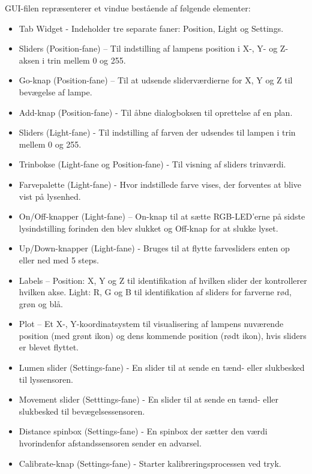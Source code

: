 GUI-filen repræsenterer et vindue bestående af følgende elementer:
\begin{itemize}

\item Tab Widget - Indeholder tre separate faner: Position, Light og Settings.

\item Sliders (Position-fane) – Til indstilling af lampens position i X-, Y- og Z-aksen i trin mellem 0 og 255.

\item Go-knap (Position-fane) – Til at udsende sliderværdierne for X, Y og Z til bevægelse af lampe.

\item Add-knap (Position-fane) - Til åbne dialogboksen til oprettelse af en plan.

\item Sliders (Light-fane) - Til indstilling af farven der udsendes til lampen i trin mellem 0 og 255.

\item Trinbokse (Light-fane og Position-fane) - Til visning af sliders trinværdi.

\item Farvepalette (Light-fane) - Hvor indstillede farve vises, der forventes at blive vist på lysenhed.

\item On/Off-knapper (Light-fane) – On-knap til at sætte RGB-LED’erne på sidste lysindstilling forinden den blev slukket og Off-knap for at slukke lyset.

\item Up/Down-knapper (Light-fane) - Bruges til at flytte farvesliders enten op eller ned med 5 steps.

\item Labels – Position: X, Y og Z til identifikation af hvilken slider der kontrollerer hvilken akse. Light: R, G og B til identifikation af sliders for farverne rød, grøn og blå.

\item Plot – Et X-, Y-koordinatsystem til visualisering af lampens nuværende position (med grønt ikon) og dens kommende position (rødt ikon), hvis sliders er blevet flyttet.

\item Lumen slider (Settings-fane) - En slider til at sende en tænd- eller slukbesked til lyssensoren.

\item Movement slider (Setttings-fane) - En slider til at sende en tænd- eller slukbesked til bevægelsessensoren.

\item Distance spinbox (Settings-fane) - En spinbox der sætter den værdi hvorindenfor afstandssensoren sender en advarsel.

\item Calibrate-knap (Settings-fane) - Starter kalibreringsprocessen ved tryk.

\end{itemize}

